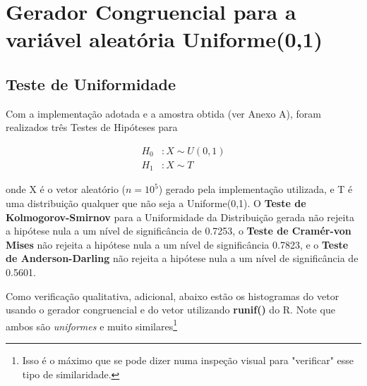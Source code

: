 \documentclass[
	article,			%
	12pt,				%
	twoside,			%
	a4paper,			%
	english,			%
	brazil,				%
	]{abntex2}
\begin{document}
\section{Gerador Congruencial para a variável aleatória Uniforme(0,1)}\label{metodo:runif_cong}
\subsection{Teste de Uniformidade}
    Com a implementação adotada e a amostra obtida (ver Anexo A), foram realizados três Testes de Hipóteses para 
        
    \begin{align*}
        H_0 & : X \sim U(0,1) \\
        H_1 & : X \sim T
    \end{align*}
    
    onde X é o vetor aleatório  ($n = 10^5$) gerado pela implementação utilizada, e T é uma distribuição qualquer que não seja a Uniforme(0,1). O \textbf{Teste de Kolmogorov-Smirnov} para a Uniformidade da Distribuição gerada não rejeita a hipótese nula a um nível de significância de 0.7253, o \textbf{Teste de Cramér-von Mises} não rejeita a hipótese nula a um nível de significância 0.7823, e o \textbf{Teste de Anderson-Darling} não rejeita a hipótese nula a um nível de significância de 0.5601. 
    
    Como verificação qualitativa, adicional, abaixo estão os histogramas do vetor usando o gerador congruencial e do vetor utilizando \textbf{runif()} do R. Note que ambos são \textit{uniformes} e muito similares\footnote{Isso é o máximo que se pode dizer numa inspeção visual para "verificar" esse tipo de similaridade.}
\end{document}
